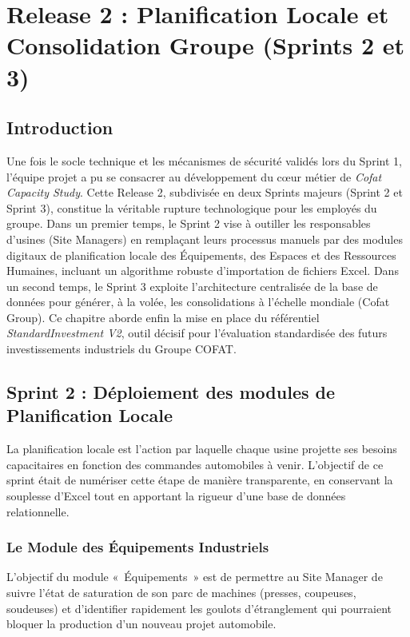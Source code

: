 \chapter{Release 2 : Planification Locale et Consolidation Groupe (Sprints 2 et 3)}
\label{chap:sprints_2_3}

\section{Introduction}
Une fois le socle technique et les mécanismes de sécurité validés lors du Sprint 1, l'équipe projet a pu se consacrer au développement du cœur métier de \textit{Cofat Capacity Study}. Cette Release 2, subdivisée en deux Sprints majeurs (Sprint 2 et Sprint 3), constitue la véritable rupture technologique pour les employés du groupe. Dans un premier temps, le Sprint 2 vise à outiller les responsables d'usines (Site Managers) en remplaçant leurs processus manuels par des modules digitaux de planification locale des Équipements, des Espaces et des Ressources Humaines, incluant un algorithme robuste d'importation de fichiers Excel. Dans un second temps, le Sprint 3 exploite l'architecture centralisée de la base de données pour générer, à la volée, les consolidations à l'échelle mondiale (Cofat Group). Ce chapitre aborde enfin la mise en place du référentiel \textit{StandardInvestment V2}, outil décisif pour l'évaluation standardisée des futurs investissements industriels du Groupe COFAT.

\section{Sprint 2 : Déploiement des modules de Planification Locale}
La planification locale est l'action par laquelle chaque usine projette ses besoins capacitaires en fonction des commandes automobiles à venir. L'objectif de ce sprint était de numériser cette étape de manière transparente, en conservant la souplesse d'Excel tout en apportant la rigueur d'une base de données relationnelle.

\subsection{Le Module des Équipements Industriels}
L'objectif du module «~Équipements~» est de permettre au Site Manager de suivre l'état de saturation de son parc de machines (presses, coupeuses, soudeuses) et d'identifier rapidement les goulots d'étranglement qui pourraient bloquer la production d'un nouveau projet automobile.

